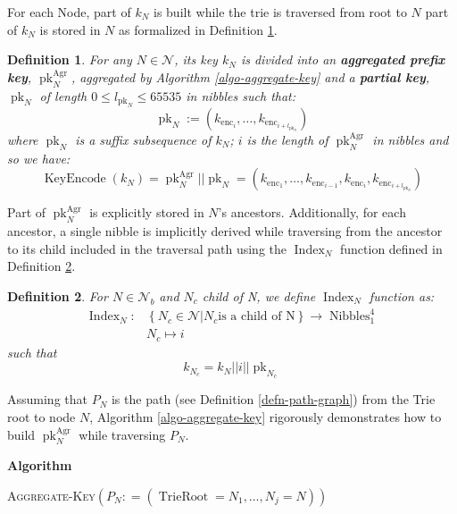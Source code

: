 \documentclass{book}
\newcommand{\assign}{:=}
\newcommand{\tmname}[1]{\textsc{#1}}
\newcommand{\tmop}[1]{\ensuremath{\operatorname{#1}}}
\newcommand{\tmstrong}[1]{\textbf{#1}}
\newcommand{\tmtextbf}[1]{{\bfseries{#1}}}
\newcommand{\tmtextup}[1]{{\upshape{#1}}}
\newenvironment{tmindent}{\begin{tmparmod}{1.5em}{0pt}{0pt}}{\end{tmparmod}}
\newenvironment{tmparmod}[3]{\begin{list}{}{\setlength{\topsep}{0pt}\setlength{\leftmargin}{#1}\setlength{\rightmargin}{#2}\setlength{\parindent}{#3}\setlength{\listparindent}{\parindent}\setlength{\itemindent}{\parindent}\setlength{\parsep}{\parskip}} \item[]}{\end{list}}
\newcounter{tmcounter}
\newcommand{\custombinding}[1]{%
  \setcounter{tmcounter}{#1}%
  \addtocounter{tmcounter}{-1}%
  \refstepcounter{tmcounter}}
\newtheorem{definition}{Definition}
\newtheorem{definition}{Definition}
\begin{document}
For each Node, part of $k_N$ is built while the trie is traversed from root to
$N$ part of $k_N$ is stored in $N$ as formalized in Definition
\ref{defn-node-key}.

\begin{definition}
  \label{defn-node-key}For any $N \in \mathcal{N}$, its key $k_N$ is divided
  into an {\tmstrong{aggregated prefix key}},
  {\tmstrong{$\tmop{pk}_N^{\tmop{Agr}}$}}, aggregated by Algorithm
  \ref{algo-aggregate-key} and a {\tmstrong{partial key}},
  {\tmstrong{$\tmop{pk}_N$}} of length $0 \leqslant l_{\tmop{pk}_N} \leqslant
  65535$ in nibbles such that:
  \[ \tmop{pk}_N \assign (k_{\tmop{enc}_i}, \ldots, k_{\tmop{enc}_{i +
     l_{\tmop{pk}_N}}}) \]
  where $\tmop{pk}_N$ is a suffix subsequence of $k_N$; $i$ is the length of
  $\tmop{pk}_N^{\tmop{Agr}}$ in nibbles and so we have:
  \[ \tmop{KeyEncode} (k_N) = \tmop{pk}_N^{\tmop{Agr}} | | \tmop{pk}_N =
     (k_{\tmop{enc}_1}, \ldots, k_{\tmop{enc}_{i - 1}}, k_{\tmop{enc}_i},
     k_{\tmop{enc}_{i + l_{\tmop{pk}_N}}}) \]
\end{definition}

Part of $\tmop{pk}_N^{\tmop{Agr}}$ is explicitly stored in $N$'s ancestors.
Additionally, for each ancestor, a single nibble is implicitly derived while
traversing from the ancestor to its child included in the traversal path using
the $\tmop{Index}_N$ function defined in Definition \ref{defn-index-function}.

\begin{definition}
  \label{defn-index-function}For $N \in \mathcal{N}_b$ and $N_c$ child of N,
  we define {\tmstrong{$\tmop{Index}_N$}} function as:
  \[ \begin{array}{cc}
       \tmop{Index}_N : & \left\{ N_c \in \mathcal{N}|N_c  \text{is a child of
       N} \right\} \rightarrow \tmop{Nibbles}^4_1\\
       & N_c \mapsto i_{}
     \end{array} \]
  such that
  \[ k_{N_c} = k_N | | i | | \tmop{pk}_{N_c} \]
\end{definition}

Assuming that $P_N$ is the path (see Definition \ref{defn-path-graph}) from
the Trie root to node $N$, Algorithm \ref{algo-aggregate-key} rigorously
demonstrates how to build $\tmop{pk}^{\tmop{Agr}}_N$ while traversing $P_N$.

\custombinding{1}{\noindent}\begin{tmparmod}{0pt}{0pt}{0em}%
    \tmtextbf{Algorithm \tmtextup{1}}{\smallskip}
    
    \begin{tmindent}
      \label{algo-aggregate-key}{\tmname{Aggregate-Key}}$(P_N : =
      (\tmop{TrieRoot} = N_1, \ldots, N_j = N))$
    \end{tmindent}
\end{tmparmod}{\medskip}
\end{document}
